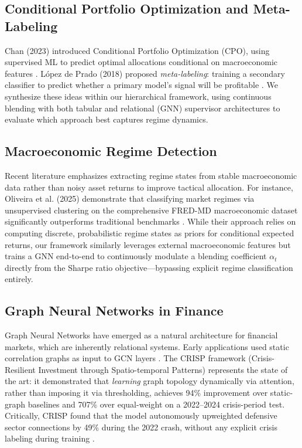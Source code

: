 \documentclass[conferences]{IEEEtran}
\begin{document}
\subsection{Conditional Portfolio Optimization and Meta-Labeling}
Chan (2023) introduced Conditional Portfolio Optimization (CPO), using supervised ML to predict optimal allocations conditional on macroeconomic features \cite{chan2023}. López de Prado (2018) proposed \emph{meta-labeling}: training a secondary classifier to predict whether a primary model's signal will be profitable \cite{lopezdeprado2018}. We synthesize these ideas within our hierarchical framework, using continuous blending with both tabular and relational (GNN) supervisor architectures to evaluate which approach best captures regime dynamics.

\subsection{Macroeconomic Regime Detection}
Recent literature emphasizes extracting regime states from stable macroeconomic data rather than noisy asset returns to improve tactical allocation. For instance, Oliveira et al. (2025) demonstrate that classifying market regimes via unsupervised clustering on the comprehensive FRED-MD macroeconomic dataset significantly outperforms traditional benchmarks \cite{oliveira2025}. While their approach relies on computing discrete, probabilistic regime states as priors for conditional expected returns, our framework similarly leverages external macroeconomic features but trains a GNN end-to-end to continuously modulate a blending coefficient $\alpha_t$ directly from the Sharpe ratio objective---bypassing explicit regime classification entirely.

\subsection{Graph Neural Networks in Finance}
Graph Neural Networks have emerged as a natural architecture for financial markets, which are inherently relational systems. Early applications used static correlation graphs as input to GCN layers \cite{chen2018}. The CRISP framework (Crisis-Resilient Investment through Spatio-temporal Patterns) represents the state of the art: it demonstrated that \emph{learning} graph topology dynamically via attention, rather than imposing it via thresholding, achieves 94\% improvement over static-graph baselines and 707\% over equal-weight on a 2022--2024 crisis-period test. Critically, CRISP found that the model autonomously upweighted defensive sector connections by 49\% during the 2022 crash, without any explicit crisis labeling during training \cite{crisp2024}.
\end{document}
